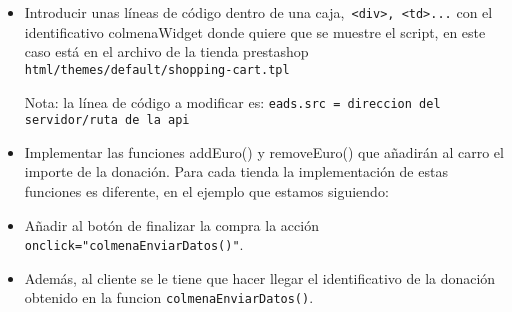\begin{itemize}
	\item  Introducir unas líneas de código dentro de una caja,\texttt{ <div>, <td>...} con el identificativo colmenaWidget donde quiere que se muestre el script, en este caso está en el archivo de la tienda prestashop \texttt{html/themes/default/shopping-cart.tpl}
	
	
	Nota: la línea de código a modificar es:
	\texttt{eads.src = {direccion del servidor}/{ruta de la api}}
	
	\item Implementar las funciones addEuro() y removeEuro() que añadirán al carro el importe de la donación. Para cada tienda la implementación de estas funciones es diferente, en el ejemplo que estamos siguiendo:
	
	
	\item Añadir al botón de finalizar la compra la acción \texttt{onclick="colmenaEnviarDatos()"}.
	
	\item Además, al cliente se le tiene que hacer llegar el identificativo de la donación obtenido en la 	funcion \texttt{colmenaEnviarDatos()}.
	
\end{itemize}